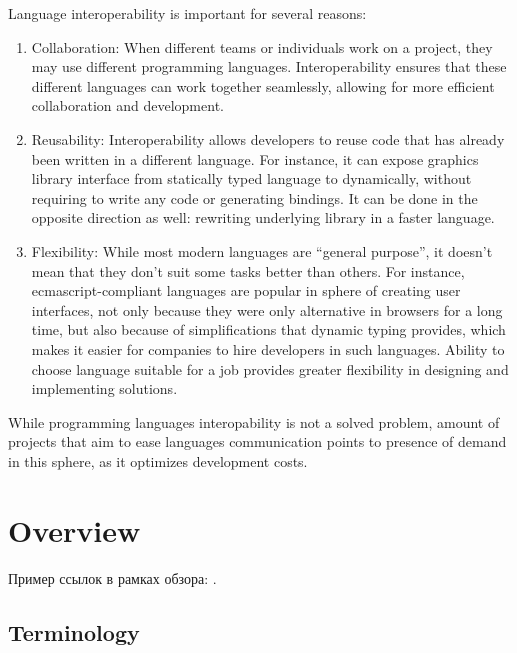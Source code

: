 \documentclass[times, %
	specification,annotation, %
	titlepage-extra-ru,specification-extra-ru,annotation-extra-ru, %
	languages={russian,english} %
	]{itmo-student-thesis}
\begin{document}
\tableofcontents

\startprefacepage

Language interoperability is important for several reasons:

\begin{enumerate}
\item Collaboration: When different teams or individuals work on a project, they may use different programming languages. Interoperability ensures that these different languages can work together seamlessly, allowing for more efficient collaboration and development.

\item Reusability: Interoperability allows developers to reuse code that has already been written in a different language. For instance, it can expose graphics library interface from statically typed language to dynamically, without requiring to write any code or generating bindings. It can be done in the opposite direction as well: rewriting underlying library in a faster language.

\item Flexibility: While most modern languages are ``general purpose'', it doesn't mean that they don't suit some tasks better than others. For instance, ecmascript-compliant languages are popular in sphere of creating user interfaces, not only because they were only alternative in browsers for a long time, but also because of simplifications that dynamic typing provides, which makes it easier for companies to hire developers in such languages. Ability to choose language suitable for a job provides greater flexibility in designing and implementing solutions.
\end{enumerate}

While programming languages interopability is not a solved problem, amount of projects that aim to ease languages communication points to presence of demand in this sphere, as it optimizes development costs.

\chapter{Overview}

\startrelatedwork
Пример ссылок в рамках обзора: \cite{example-english, example-russian, unrestricted-jump-evco, doerr-doerr-lambda-lambda-self-adjustment-arxiv}.

\section{Terminology}
\TODO
\end{document}
